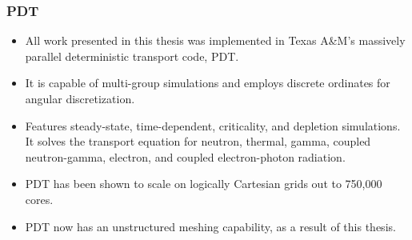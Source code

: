 \documentclass[]{beamer}
\begin{document}
\begin{frame}[t]\frametitle{PDT}
	\begin{block}{}
	\begin{itemize}
		\item All work presented in this thesis was implemented in Texas A\&M's massively parallel deterministic transport code, PDT. 
		\item It is capable of multi-group simulations and employs discrete ordinates for angular discretization.
		\item Features steady-state, time-dependent, criticality, and depletion simulations. It solves the transport equation for neutron, thermal, gamma, coupled neutron-gamma, electron, and coupled electron-photon radiation.
		\item  PDT  has been shown to scale on logically Cartesian grids out to 750,000 cores.
		\item PDT now has an unstructured meshing capability, as a result of this thesis.
		\end{itemize}
	\end{block}
\end{frame}
\end{document}
